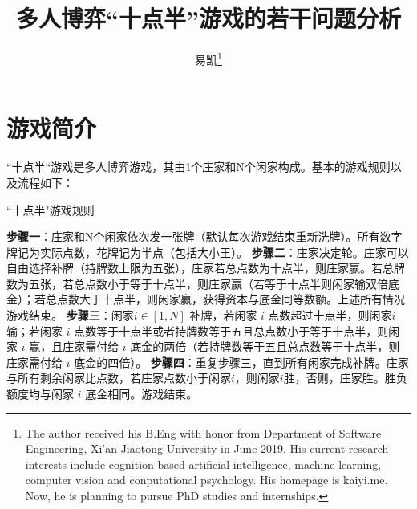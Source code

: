 \documentclass[10pt,twocolumn,letterpaper]{article}
\begin{document}
\title{多人博弈``十点半”游戏的若干问题分析}

\author{易凯\thanks{The author received his B.Eng with honor from Department of Software Engineering, Xi'an Jiaotong University in June 2019. His current research interests include cognition-based artificial intelligence, machine learning, computer vision and conputational psychology. His homepage is kaiyi.me. Now, he is planning to pursue PhD studies and internships.}
}

\maketitle

\section{游戏简介}
``十点半“游戏是多人博弈游戏，其由1个庄家和N个闲家构成。基本的游戏规则以及流程如下：

\begin{algorithm}[!htp]
\caption{``十点半"游戏规则}
\label{alg:A}
\begin{algorithmic}
\STATE \textbf{步骤一}：庄家和N个闲家依次发一张牌（默认每次游戏结束重新洗牌）。所有数字牌记为实际点数，花牌记为半点（包括大小王）。
\STATE \textbf{步骤二}：庄家决定轮。庄家可以自由选择补牌（持牌数上限为五张），庄家若总点数为十点半，则庄家赢。若总牌数为五张，若总点数小于等于十点半，则庄家赢（若等于十点半则闲家输双倍底金）；若总点数大于十点半，则闲家赢，获得资本与底金同等数额。上述所有情况游戏结束。
\STATE \textbf{步骤三}：闲家$i\in [1, N]$ 补牌，若闲家 $i$ 点数超过十点半，则闲家$i$输；若闲家 $i$ 点数等于十点半或者持牌数等于五且总点数小于等于十点半，则闲家 $i$ 赢，且庄家需付给 $i$ 底金的两倍（若持牌数等于五且总点数等于十点半，则庄家需付给 $i$ 底金的四倍）。
\STATE \textbf{步骤四}：重复步骤三，直到所有闲家完成补牌。庄家与所有剩余闲家比点数，若庄家点数小于闲家$i$，则闲家$i$胜，否则，庄家胜。胜负额度均与闲家 $i$ 底金相同。游戏结束。
\end{algorithmic}
\end{algorithm}
\end{document}

